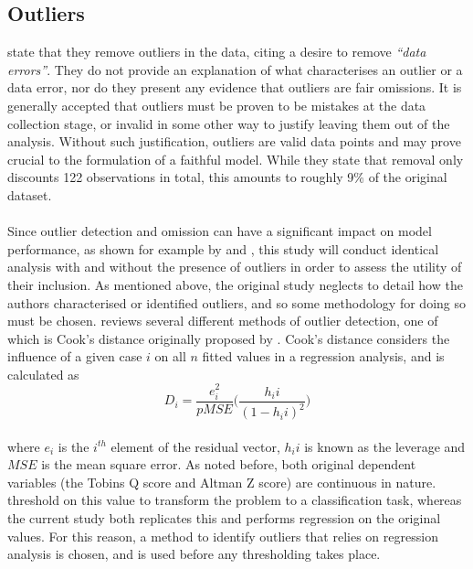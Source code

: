 {\subsection{Outliers}\label{outliers}
\cite{moldovan2015learning} state that they remove outliers in the data, citing a desire to remove {\it ``data errors''}. They do not provide an explanation of what characterises an outlier or a data error, nor do they present any evidence that outliers are fair omissions. It is generally accepted that outliers must be proven to be mistakes at the data collection stage, or invalid in some other way to justify leaving them out of the analysis. Without such justification, outliers are valid data points and may prove crucial to the formulation of a faithful model. While they state that removal only discounts 122 observations in total, this amounts to roughly 9\% of the original dataset.\\\\
Since outlier detection and omission can have a significant impact on model performance, as shown for example by \cite{Pollet2017} and \cite{Wobbe2011}, this study will conduct identical analysis with and without the presence of outliers in order to assess the utility of their inclusion. As mentioned above, the original study neglects to detail how the authors characterised or identified outliers, and so some methodology for doing so must be chosen. \cite{denisCookReview} reviews several different methods of outlier detection, one of which is Cook's distance originally proposed by \cite{cookOrig}. Cook's distance considers the influence of a given case $i$ on all $n$ fitted values in a regression analysis, and is calculated as
\begin {equation}\label{CooksDistance}
D_i = \frac{e^2_i}{pMSE} \Big(  \frac{h_ii}{(1 - h_ii)^2}  \Big)
\end{equation}\\
where $e_i$ is the $i^{th}$  element of the residual vector, $h_ii$ is known as the leverage and $MSE$ is the mean square error. As noted before, both original dependent variables (the Tobins Q score and Altman Z score) are continuous in nature. \cite{moldovan2015learning} threshold on this value to transform the problem to a classification task, whereas the current study both replicates this and performs regression on the original values. For this reason, a method to identify outliers that relies on regression analysis is chosen, and is used before any thresholding takes place. 
}
